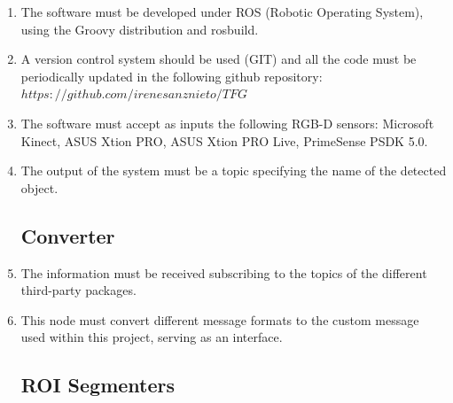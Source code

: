 \begin{enumerate}[label=\textbf{FR\threedigits*}, leftmargin=2cm]

	\item The software must be developed under ROS (Robotic Operating System), using the Groovy distribution and rosbuild.
	\item A version control system should be used (GIT) and all the code must be periodically updated in the following github repository:  $https://github.com/irenesanznieto/TFG$
	\item The software must accept as inputs the following RGB-D sensors: Microsoft Kinect, ASUS Xtion PRO, ASUS Xtion PRO Live, PrimeSense PSDK 5.0.
	\item The output of the system must be a topic specifying the name of the detected object. 
 
 
\hspace*{-2cm}\subsection{Converter}

\item The information must be received subscribing to the topics of the different third-party packages. 
\item This node must convert different message formats to the custom message used within this project, serving as an interface. 


\subsection{ROI Segmenters}


\end{enumerate}
